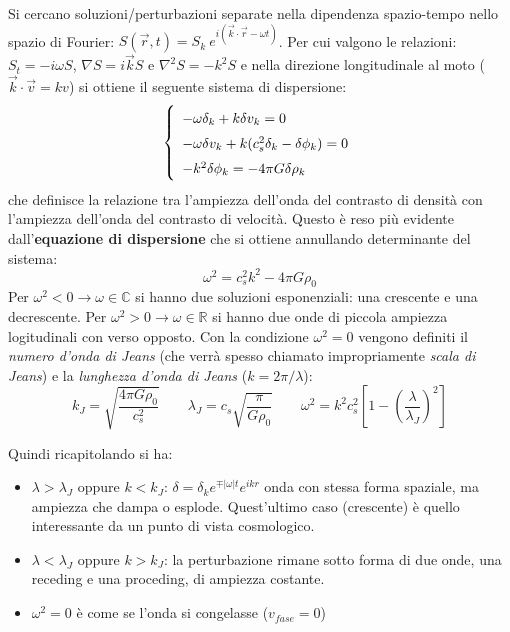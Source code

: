 Si cercano soluzioni/perturbazioni separate nella dipendenza spazio-tempo nello spazio di Fourier: $S(\vec{r},t)=S_k \: e^{i(\vec{k}\cdot\vec{r}-\omega t)}$. Per cui valgono le relazioni: $S_t = -i\omega S$, $\nabla S = i\vec{k}S$ e $\nabla^2 S= -k^2 S$ e nella direzione longitudinale al moto ($\vec{k}\cdot\vec{v}=kv$) si ottiene il seguente sistema di dispersione:
\begin{equation}\left\{
    \def\arraystretch{1.5}
        \begin{array}{l}
        - \omega \delta_k + k \delta v_k = 0 \\
        - \omega \delta v_k + k (c_s^2\delta_k -\delta\phi_k) = 0 \\
        - k^2 \delta\phi_k = -4\pi G\delta\rho_k
    \end{array}\right. 
\end{equation}
che definisce la relazione tra l'ampiezza dell'onda del contrasto di densità con l'ampiezza dell'onda del contrasto di velocità. Questo è reso più evidente dall'\textbf{equazione di dispersione} che si ottiene annullando determinante del sistema:
\begin{equation}
    \omega^2 = c_s^2 k^2 - 4\pi G \rho_0 \label{eq:6disprelstatic}
\end{equation}
Per $\omega^2 < 0 \rightarrow \omega \in \mathbb{C}$ si hanno due soluzioni esponenziali: una crescente e una decrescente. Per $\omega^2 > 0 \rightarrow \omega \in \mathbb{R}$ si hanno due onde di piccola ampiezza logitudinali con verso opposto. Con la condizione $\omega^2 = 0$ vengono definiti il \textit{numero d'onda di Jeans} (che verrà spesso chiamato impropriamente \textit{scala di Jeans}) e la \textit{lunghezza d'onda di Jeans} ($k=2\pi /\lambda$):
\begin{equation}
k_J = \sqrt{\frac{4\pi G \rho_0}{c_s^2}} \qquad \lambda_J=c_s\sqrt{\frac{\pi}{G\rho_0}} \qquad \omega^2=k^2 c_s^2 \left[1- \left(\frac{\lambda}{\lambda_J}\right)^2\right]
\end{equation}

Quindi ricapitolando si ha:
\begin{itemize}
    \item $\lambda >\lambda_J$ oppure $k<k_J$: $\delta = \delta_k e^{\mp |\omega| t}e^{ikr} $ onda con stessa forma spaziale, ma ampiezza che dampa o esplode. Quest'ultimo caso (crescente) è quello interessante da un punto di vista cosmologico.
    \item $\lambda <\lambda_J$ oppure $k>k_J$: la perturbazione rimane sotto forma di due onde, una receding e una proceding, di ampiezza costante.
    \item $\omega^2=0$ è come se l'onda si congelasse ($v_{fase}=0$)
\end{itemize}

